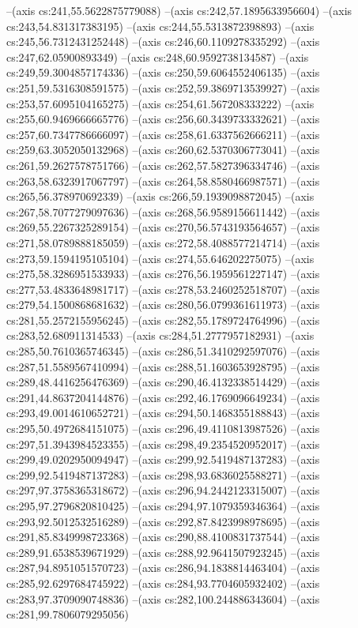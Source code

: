 --(axis cs:241,55.5622875779088)
--(axis cs:242,57.1895633956604)
--(axis cs:243,54.831317383195)
--(axis cs:244,55.5313872398893)
--(axis cs:245,56.7312431252448)
--(axis cs:246,60.1109278335292)
--(axis cs:247,62.05900893349)
--(axis cs:248,60.9592738134587)
--(axis cs:249,59.3004857174336)
--(axis cs:250,59.6064552406135)
--(axis cs:251,59.5316308591575)
--(axis cs:252,59.3869713539927)
--(axis cs:253,57.6095104165275)
--(axis cs:254,61.567208333222)
--(axis cs:255,60.9469666665776)
--(axis cs:256,60.3439733332621)
--(axis cs:257,60.7347786666097)
--(axis cs:258,61.6337562666211)
--(axis cs:259,63.3052050132968)
--(axis cs:260,62.5370306773041)
--(axis cs:261,59.2627578751766)
--(axis cs:262,57.5827396334746)
--(axis cs:263,58.6323917067797)
--(axis cs:264,58.8580466987571)
--(axis cs:265,56.378970692339)
--(axis cs:266,59.1939098872045)
--(axis cs:267,58.7077279097636)
--(axis cs:268,56.9589156611442)
--(axis cs:269,55.2267325289154)
--(axis cs:270,56.5743193564657)
--(axis cs:271,58.0789888185059)
--(axis cs:272,58.4088577214714)
--(axis cs:273,59.1594195105104)
--(axis cs:274,55.646202275075)
--(axis cs:275,58.3286951533933)
--(axis cs:276,56.1959561227147)
--(axis cs:277,53.4833648981717)
--(axis cs:278,53.2460252518707)
--(axis cs:279,54.1500868681632)
--(axis cs:280,56.0799361611973)
--(axis cs:281,55.2572155956245)
--(axis cs:282,55.1789724764996)
--(axis cs:283,52.680911314533)
--(axis cs:284,51.2777957182931)
--(axis cs:285,50.7610365746345)
--(axis cs:286,51.3410292597076)
--(axis cs:287,51.5589567410994)
--(axis cs:288,51.1603653928795)
--(axis cs:289,48.4416256476369)
--(axis cs:290,46.4132338514429)
--(axis cs:291,44.8637204144876)
--(axis cs:292,46.1769096649234)
--(axis cs:293,49.0014610652721)
--(axis cs:294,50.1468355188843)
--(axis cs:295,50.4972684151075)
--(axis cs:296,49.4110813987526)
--(axis cs:297,51.3943984523355)
--(axis cs:298,49.2354520952017)
--(axis cs:299,49.0202950094947)
--(axis cs:299,92.5419487137283)
--(axis cs:299,92.5419487137283)
--(axis cs:298,93.6836025588271)
--(axis cs:297,97.3758365318672)
--(axis cs:296,94.2442123315007)
--(axis cs:295,97.2796820810425)
--(axis cs:294,97.1079359346364)
--(axis cs:293,92.5012532516289)
--(axis cs:292,87.8423998978695)
--(axis cs:291,85.8349998723368)
--(axis cs:290,88.4100831737544)
--(axis cs:289,91.6538539671929)
--(axis cs:288,92.9641507923245)
--(axis cs:287,94.8951051570723)
--(axis cs:286,94.1838814463404)
--(axis cs:285,92.6297684745922)
--(axis cs:284,93.7704605932402)
--(axis cs:283,97.3709090748836)
--(axis cs:282,100.244886343604)
--(axis cs:281,99.7806079295056)
